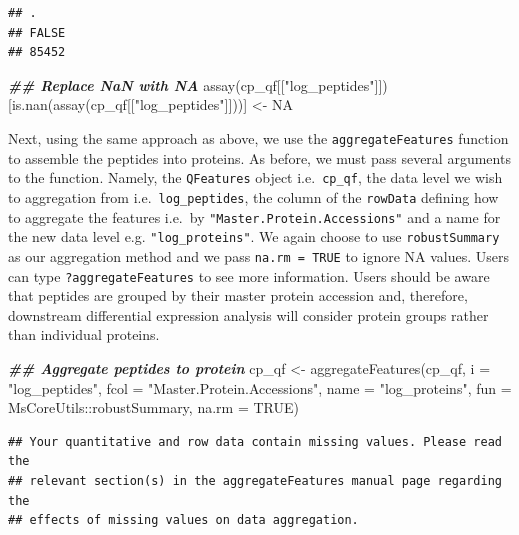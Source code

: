 \documentclass[9pt,a4paper,]{extarticle}
\newenvironment{Shaded}{\begin{snugshade}}{\end{snugshade}}
\newcommand{\AttributeTok}[1]{\textcolor[rgb]{0.77,0.63,0.00}{#1}}
\newcommand{\ConstantTok}[1]{\textcolor[rgb]{0.00,0.00,0.00}{#1}}
\newcommand{\DocumentationTok}[1]{\textcolor[rgb]{0.56,0.35,0.01}{\textbf{\textit{#1}}}}
\newcommand{\FunctionTok}[1]{\textcolor[rgb]{0.00,0.00,0.00}{#1}}
\newcommand{\NormalTok}[1]{#1}
\newcommand{\OtherTok}[1]{\textcolor[rgb]{0.56,0.35,0.01}{#1}}
\newcommand{\SpecialCharTok}[1]{\textcolor[rgb]{0.00,0.00,0.00}{#1}}
\newcommand{\StringTok}[1]{\textcolor[rgb]{0.31,0.60,0.02}{#1}}
\begin{document}
\begin{verbatim}
## .
## FALSE 
## 85452
\end{verbatim}

\begin{Shaded}
\begin{Highlighting}[]
\DocumentationTok{\#\# Replace NaN with NA}
\FunctionTok{assay}\NormalTok{(cp\_qf[[}\StringTok{"log\_peptides"}\NormalTok{]])[}\FunctionTok{is.nan}\NormalTok{(}\FunctionTok{assay}\NormalTok{(cp\_qf[[}\StringTok{"log\_peptides"}\NormalTok{]]))] }\OtherTok{\textless{}{-}} \ConstantTok{NA}
\end{Highlighting}
\end{Shaded}

Next, using the same approach as above, we use the \texttt{aggregateFeatures} function
to assemble the peptides into proteins. As before, we must pass several
arguments to the function. Namely, the \texttt{QFeatures} object i.e.~\texttt{cp\_qf}, the data
level we wish to aggregation from i.e.~\texttt{log\_peptides}, the column of the
\texttt{rowData} defining how to aggregate the features i.e.~by
\texttt{"Master.Protein.Accessions"} and a name for the new data level e.g.
\texttt{"log\_proteins"}. We again choose to use \texttt{robustSummary} as our aggregation
method and we pass \texttt{na.rm\ =\ TRUE} to ignore NA values. Users can type
\texttt{?aggregateFeatures} to see more information. Users should be aware that
peptides are grouped by their master protein accession and, therefore,
downstream differential expression analysis will consider protein groups rather
than individual proteins.

\begin{Shaded}
\begin{Highlighting}[]
\DocumentationTok{\#\# Aggregate peptides to protein}
\NormalTok{cp\_qf }\OtherTok{\textless{}{-}} \FunctionTok{aggregateFeatures}\NormalTok{(cp\_qf,}
                           \AttributeTok{i =} \StringTok{"log\_peptides"}\NormalTok{,}
                           \AttributeTok{fcol =} \StringTok{"Master.Protein.Accessions"}\NormalTok{,}
                           \AttributeTok{name =} \StringTok{"log\_proteins"}\NormalTok{,}
                           \AttributeTok{fun =}\NormalTok{ MsCoreUtils}\SpecialCharTok{::}\NormalTok{robustSummary,}
                           \AttributeTok{na.rm =} \ConstantTok{TRUE}\NormalTok{)}
\end{Highlighting}
\end{Shaded}

\begin{verbatim}
## Your quantitative and row data contain missing values. Please read the
## relevant section(s) in the aggregateFeatures manual page regarding the
## effects of missing values on data aggregation.
\end{verbatim}
\end{document}

